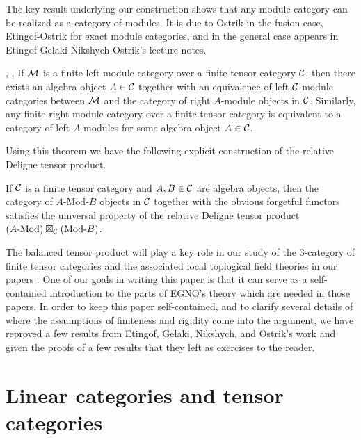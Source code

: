 \documentclass{amsart}
\begin{document}
The key result underlying our construction shows that any module category can be realized as a category of modules.  It is due to Ostrik in the fusion case, Etingof-Ostrik for exact module categories, and in the general case appears in Etingof-Gelaki-Nikshych-Ostrik's lecture notes.

\begin{theorem}{\cite[Thm 2.11.6]{EGNO}, \cite[\S 3.2]{EO-ftc}, \cite[Thm 1]{MR1976459}} %
	If $\mathcal M$ is a finite left module category over a finite tensor category $\mathcal C$, then there exists an algebra object $A \in \mathcal C$ together with an equivalence of left $\mathcal C$-module categories between $\mathcal M$ and the category of right $A$-module objects in $\mathcal C$.  Similarly, any finite right module category over a finite tensor category is equivalent to a category of left $A$-modules for some algebra object $A \in \mathcal C$.
\end{theorem}

Using this theorem we have the following explicit construction of the relative Deligne tensor product.

\begin{theorem}
If $\mathcal C$ is a finite tensor category and $A, B \in \mathcal C$ are algebra objects, then the category of $A\text{-Mod-}B$ objects in $\mathcal C$ together with the obvious forgetful functors satisfies the universal property of the relative Deligne tensor product $(A\text{-Mod}) \boxtimes_\mathcal C (\text{Mod-}B)$.
\end{theorem}

The balanced tensor product will play a key role in our study of the $3$-category of finite tensor categories and the associated local toplogical field theories in our papers \cite{3TC, DTCI}.  One of our goals in writing this paper is that it can serve as a self-contained introduction to the parts of EGNO's theory which are needed in those papers.  In order to keep this paper self-contained, and to clarify several details of where the assumptions of finiteness and rigidity come into the argument, we have reproved a few results from Etingof, Gelaki, Nikshych, and Ostrik's work and given the proofs of a few results that they left as exercises to the reader.


\section{Linear categories and tensor categories} \label{sec:tc-lincat}
\end{document}
